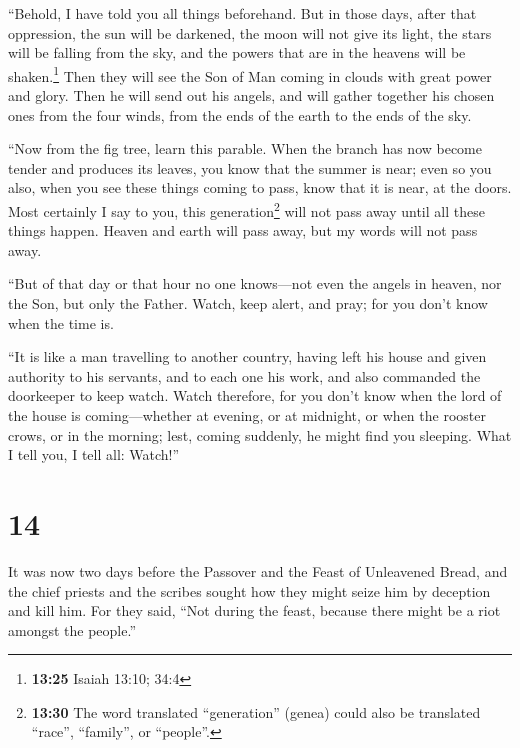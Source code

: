 ``Behold, I have told you all things beforehand.  But in
those days, after that oppression, the sun will be darkened, the moon
will not give its light,  the stars will be falling from
the sky, and the powers that are in the heavens will be
shaken.\footnote{\textbf{13:25} Isaiah 13:10; 34:4}  Then
they will see the Son of Man coming in clouds with great power and
glory.  Then he will send out his angels, and will gather
together his chosen ones from the four winds, from the ends of the earth
to the ends of the sky.

 ``Now from the fig tree, learn this parable. When the
branch has now become tender and produces its leaves, you know that the
summer is near;  even so you also, when you see these
things coming to pass, know that it is near, at the doors.
 Most certainly I say to you, this generation\footnote{\textbf{13:30}
  The word translated ``generation'' (genea) could also be translated
  ``race'', ``family'', or ``people''.} will not pass away until all
these things happen.  Heaven and earth will pass away,
but my words will not pass away.

 ``But of that day or that hour no one knows---not even
the angels in heaven, nor the Son, but only the Father. 
Watch, keep alert, and pray; for you don't know when the time is.

 ``It is like a man travelling to another country, having
left his house and given authority to his servants, and to each one his
work, and also commanded the doorkeeper to keep watch. 
Watch therefore, for you don't know when the lord of the house is
coming---whether at evening, or at midnight, or when the rooster crows,
or in the morning;  lest, coming suddenly, he might find
you sleeping.  What I tell you, I tell all: Watch!''

\hypertarget{section-13}{%
\section{14}\label{section-13}}

 It was now two days before the Passover and the Feast of
Unleavened Bread, and the chief priests and the scribes sought how they
might seize him by deception and kill him.  For they said,
``Not during the feast, because there might be a riot amongst the
people.''

